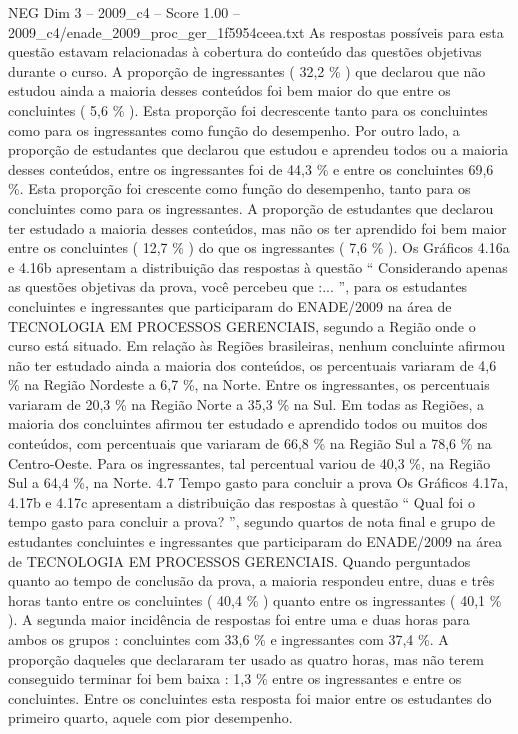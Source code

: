 \begin{textsample}{NEG Dim 3 – 2009\_c4 – Score 1.00 – 2009\_c4/enade\_2009\_proc\_ger\_1f5954ceea.txt}
As respostas possíveis para esta questão estavam relacionadas à cobertura do conteúdo das questões objetivas durante o curso.
A proporção de ingressantes ( 32,2 \% ) que declarou que não estudou ainda a maioria desses conteúdos foi bem maior do que entre os concluintes ( 5,6 \% ).
Esta proporção foi decrescente tanto para os concluintes como para os ingressantes como função do desempenho.
Por outro lado, a proporção de estudantes que declarou que estudou e aprendeu todos ou a maioria desses conteúdos, entre os ingressantes foi de 44,3 \% e entre os concluintes 69,6 \%.
Esta proporção foi crescente como função do desempenho, tanto para os concluintes como para os ingressantes.
A proporção de estudantes que declarou ter estudado a maioria desses conteúdos, mas não os ter aprendido foi bem maior entre os concluintes ( 12,7 \% ) do que os ingressantes ( 7,6 \% ).
Os Gráficos 4.16a e 4.16b apresentam a distribuição das respostas à questão “ Considerando apenas as questões objetivas da prova, você percebeu que :... ”, para os estudantes concluintes e ingressantes que participaram do ENADE/2009 na área de TECNOLOGIA EM PROCESSOS GERENCIAIS, segundo a Região onde o curso está situado.
Em relação às Regiões brasileiras, nenhum concluinte afirmou não ter estudado ainda a maioria dos conteúdos, os percentuais variaram de 4,6 \% na Região Nordeste a 6,7 \%, na Norte.
Entre os ingressantes, os percentuais variaram de 20,3 \% na Região Norte a 35,3 \% na Sul.
Em todas as Regiões, a maioria dos concluintes afirmou ter estudado e aprendido todos ou muitos dos conteúdos, com percentuais que variaram de 66,8 \% na Região Sul a 78,6 \% na Centro-Oeste.
Para os ingressantes, tal percentual variou de 40,3 \%, na Região Sul a 64,4 \%, na Norte. 4.7 Tempo gasto para concluir a prova Os Gráficos 4.17a, 4.17b e 4.17c apresentam a distribuição das respostas à questão “ Qual foi o tempo gasto para concluir a prova? ”, segundo quartos de nota final e grupo de estudantes concluintes e ingressantes que participaram do ENADE/2009 na área de TECNOLOGIA EM PROCESSOS GERENCIAIS.
Quando perguntados quanto ao tempo de conclusão da prova, a maioria respondeu entre, duas e três horas tanto entre os concluintes ( 40,4 \% ) quanto entre os ingressantes ( 40,1 \% ).
A segunda maior incidência de respostas foi entre uma e duas horas para ambos os grupos : concluintes com 33,6 \% e ingressantes com 37,4 \%.
A proporção daqueles que declararam ter usado as quatro horas, mas não terem conseguido terminar foi bem baixa : 1,3 \% entre os ingressantes e entre os concluintes.
Entre os concluintes esta resposta foi maior entre os estudantes do primeiro quarto, aquele com pior desempenho.

\end{textsample}
